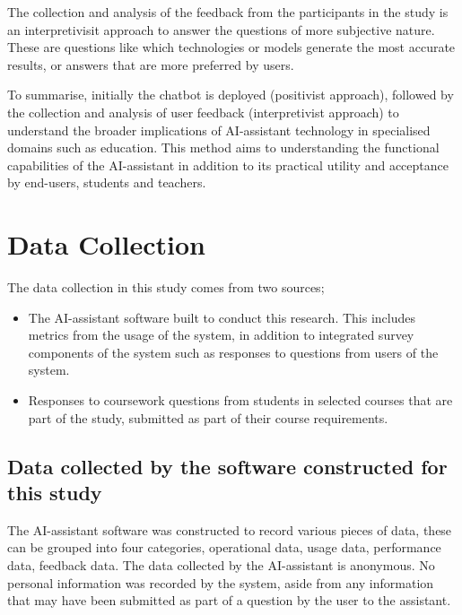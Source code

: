 The collection and analysis of the feedback from the participants in the study is an interpretivisit approach to answer the questions of more subjective nature. These are questions like which technologies or models generate the most accurate results, or answers that are more preferred by users.


To summarise, initially the chatbot is deployed (positivist approach), followed by the collection and analysis of user feedback (interpretivist approach) to understand the broader implications of AI-assistant technology in specialised domains such as education. This method aims to understanding the functional capabilities of the AI-assistant in addition to its practical utility and acceptance by end-users, students and teachers.




\section{Data Collection}
\label{sec:dataCollection}




The data collection in this study comes from two sources;


\begin{itemize}
        \item The AI-assistant software built to conduct this research. This includes metrics from the usage of the system, in addition to integrated survey components of the system such as responses to questions from users of the system.
        \item Responses to coursework questions from students in selected courses that are part of the study, submitted as part of their course requirements.
\end{itemize}


\subsection{Data collected by the software constructed for this study}


The AI-assistant software was constructed to record various pieces of data, these can be grouped into four categories, operational data, usage data, performance data, feedback data. The data collected by the AI-assistant is anonymous. No personal information was recorded by the system, aside from any information that may have been submitted as part of a question by the user to the assistant.



